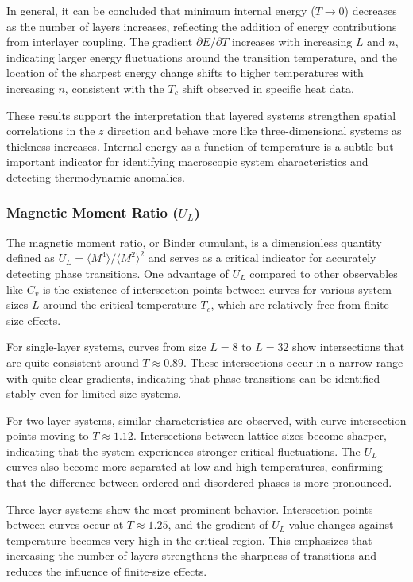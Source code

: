 In general, it can be concluded that minimum internal energy ($T \rightarrow 0$) decreases as the number of layers increases, reflecting the addition of energy contributions from interlayer coupling. The gradient $\partial E/\partial T$ increases with increasing $L$ and $n$, indicating larger energy fluctuations around the transition temperature, and the location of the sharpest energy change shifts to higher temperatures with increasing $n$, consistent with the $T_c$ shift observed in specific heat data.

These results support the interpretation that layered systems strengthen spatial correlations in the $z$ direction and behave more like three-dimensional systems as thickness increases. Internal energy as a function of temperature is a subtle but important indicator for identifying macroscopic system characteristics and detecting thermodynamic anomalies.

\subsubsection{Magnetic Moment Ratio ($U_L$)}

The magnetic moment ratio, or Binder cumulant, is a dimensionless quantity defined as $U_L = \langle M^4 \rangle/\langle M^2 \rangle^2$ and serves as a critical indicator for accurately detecting phase transitions. One advantage of $U_L$ compared to other observables like $C_v$ is the existence of intersection points between curves for various system sizes $L$ around the critical temperature $T_c$, which are relatively free from finite-size effects.

For single-layer systems, curves from size $L = 8$ to $L = 32$ show intersections that are quite consistent around $T \approx 0.89$. These intersections occur in a narrow range with quite clear gradients, indicating that phase transitions can be identified stably even for limited-size systems.

For two-layer systems, similar characteristics are observed, with curve intersection points moving to $T \approx 1.12$. Intersections between lattice sizes become sharper, indicating that the system experiences stronger critical fluctuations. The $U_L$ curves also become more separated at low and high temperatures, confirming that the difference between ordered and disordered phases is more pronounced.

Three-layer systems show the most prominent behavior. Intersection points between curves occur at $T \approx 1.25$, and the gradient of $U_L$ value changes against temperature becomes very high in the critical region. This emphasizes that increasing the number of layers strengthens the sharpness of transitions and reduces the influence of finite-size effects.

